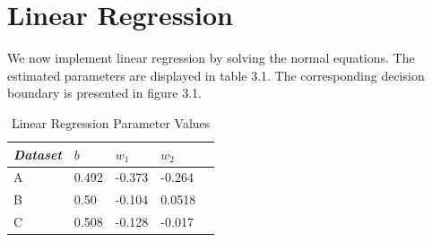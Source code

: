 \documentclass[paper=a4, fontsize=11pt]{scrartcl} %
\numberwithin{equation}{section} %
\numberwithin{figure}{section} %
\numberwithin{table}{section} %
\begin{document}
	\section{Linear Regression}
	We now implement linear regression by solving the normal equations. The estimated parameters are displayed in table 3.1. The corresponding decision boundary is presented in figure 3.1.
	
	\begin{table}
		\caption {Linear Regression Parameter Values} \label{tab:title} 
		\begin{center}		
			\begin{tabular}{*5l}   
				\toprule
				\emph{Dataset}&  $b$ & $w_1$  & $w_2$\\\midrule
				A & 0.492 & -0.373 & -0.264 \\ 
				B & 0.50 & -0.104 & 0.0518 \\
				C & 0.508 & -0.128 & -0.017 \\\bottomrule
				\hline
			\end{tabular}
		\end{center}
	\end{table}
\end{document}
